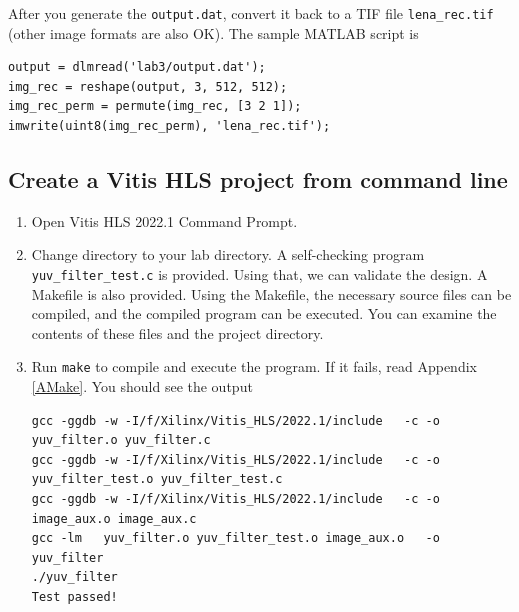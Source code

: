 \documentclass[a4paper,12pt,twoside]{article}
\begin{document}
After you generate the \texttt{output.dat}, convert it back to a TIF file \texttt{lena\_rec.tif} (other image formats are also OK). The sample MATLAB script is
\begin{verbatim}
output = dlmread('lab3/output.dat');
img_rec = reshape(output, 3, 512, 512);
img_rec_perm = permute(img_rec, [3 2 1]);
imwrite(uint8(img_rec_perm), 'lena_rec.tif');
\end{verbatim}

\subsection{Create a Vitis HLS project from command line}
\begin{enumerate}
    \item Open Vitis HLS 2022.1 Command Prompt.
    \item Change directory to your lab directory. A self-checking program \texttt{yuv\_filter\_test.c} is provided. Using that, we can validate the design. A Makefile is also provided. Using the Makefile, the necessary source files can be compiled, and the compiled program can be executed. You can examine the contents of these files and the project directory.
    \item Run \texttt{make} to compile and execute the program. If it fails, read Appendix \ref{AMake}. You should see the output
    \begin{verbatim}
gcc -ggdb -w -I/f/Xilinx/Vitis_HLS/2022.1/include   -c -o yuv_filter.o yuv_filter.c
gcc -ggdb -w -I/f/Xilinx/Vitis_HLS/2022.1/include   -c -o yuv_filter_test.o yuv_filter_test.c
gcc -ggdb -w -I/f/Xilinx/Vitis_HLS/2022.1/include   -c -o image_aux.o image_aux.c
gcc -lm   yuv_filter.o yuv_filter_test.o image_aux.o   -o yuv_filter
./yuv_filter
Test passed!


\end{verbatim}
\end{enumerate}
\end{document}
